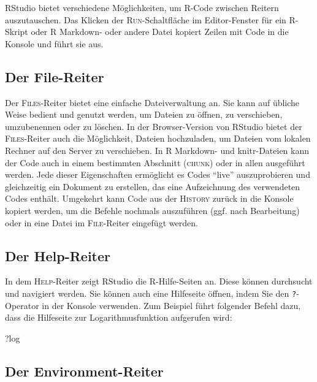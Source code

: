 \documentclass[
  ngerman,
]{scrbook}
\newenvironment{Shaded}{\begin{snugshade}}{\end{snugshade}}
\newcommand{\NormalTok}[1]{#1}
\begin{document}
\textsf{RStudio} bietet verschiedene Möglichkeiten, um \textsf{R}-Code zwischen Reitern auszutauschen. Das Klicken der \textsc{Run}-Schaltfläche im Editor-Fenster für ein \textsf{R}-Skript oder \textsf{R Markdown}- oder andere Datei kopiert Zeilen mit Code in die Konsole und führt sie aus.

\hypertarget{der-file-reiter}{%
\subsection{Der File-Reiter}\label{der-file-reiter}}

Der \textsc{Files}-Reiter bietet eine einfache Dateiverwaltung an. Sie kann auf übliche Weise bedient und genutzt werden, um Dateien zu öffnen, zu verschieben, umzubenennen oder zu löschen. In der Browser-Version von \textsf{RStudio} bietet der \textsc{Files}-Reiter auch die Möglichkeit, Dateien hochzuladen, um Dateien vom lokalen Rechner auf den Server zu verschieben. In \textsf{R Markdown}- und \textsf{knitr}-Dateien kann der Code auch in einem bestimmten Abschnitt (\textsc{chunk}) oder in allen ausgeführt werden. Jede dieser Eigenschaften ermöglicht es Codes ``live'' auszuprobieren und gleichzeitig ein Dokument zu erstellen, das eine Aufzeichnung des verwendeten Codes enthält.
Umgekehrt kann Code aus der \textsc{History} zurück in die Konsole kopiert werden, um die Befehle nochmals auszuführen (ggf. nach Bearbeitung) oder in eine Datei im \textsc{File}-Reiter eingefügt werden.

\hypertarget{der-help-reiter}{%
\subsection{Der Help-Reiter}\label{der-help-reiter}}

In dem \textsc{Help}-Reiter zeigt \textsf{RStudio} die \textsf{R}-Hilfe-Seiten an. Diese können durchsucht und navigiert werden. Sie können auch eine Hilfeseite öffnen, indem Sie den \texttt{?}-Operator in der Konsole verwenden.
Zum Beispiel führt folgender Befehl dazu, dass die Hilfeseite zur Logarithmusfunktion aufgerufen wird:

\begin{Shaded}
\begin{Highlighting}[]
\NormalTok{?log}
\end{Highlighting}
\end{Shaded}

\hypertarget{der-environment-reiter}{%
\subsection{Der Environment-Reiter}\label{der-environment-reiter}}
\end{document}

